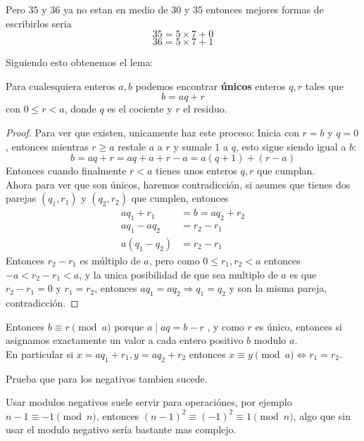 \documentclass[11pt]{scrartcl}
\begin{document}
Pero $35$ y $36$ ya no estan en medio de $30$ y $35$ entonces mejores formas de escribirlos seria
\[35= 5\times 7+0\]
\[36= 5 \times 7 +1\]

Siguiendo esto obtenemos el lema:
\begin{lemma} 
Para cualesquiera enteros $a,b$ podemos encontrar \textbf{\'unicos} enteros $q,r$ tales que 
\[b = aq+r\]
con $0 \leq r <a$, donde $q$ es el cociente y $r$ el residuo.
\end{lemma}

\begin{proof}
Para ver que existen, unicamente haz este proceso: Inicia con $r=b$ y $q=0$, entonces mientras $r\geq a$ restale $a$ a $r$ y sumale $1$ a $q$, esto sigue siendo igual a $b$:
\[b=aq+r = aq+a+r-a = a(q+1)+(r-a)\]
Entonces cuando finalmente $r<a$ tienes unos enteros $q,r$ que cumplan. \\

Ahora para ver que son \'unicos, haremos contradicci\'on, si asumes que tienes dos parejas $(q_1,r_1)$ y $(q_2, r_2)$ que cumplen, entonces 
\begin{align*}
aq_1+r_1&=b=aq_2+r_2 \\
aq_1-aq_2&=r_2-r_1 \\
a(q_1-q_2)&=r_2-r_1 
\end{align*}
Entonces $r_2-r_1$ es m\'ultiplo de $a$, pero como $0\leq r_1,r_2 < a$ entonces $-a < r_2-r_1  < a$, y la unica posibilidad de que sea multiplo de $a$ es que $r_2-r_1=0$ y $r_1=r_2$, entonces $aq_1=aq_2 \Rightarrow q_1=q_2$ y son la misma pareja, contradicci\'on.

\end{proof}

Entonces $b \equiv r \pmod a$ porque $a \mid aq = b-r$ , y como $r$ es \'unico, entonces si asignamos exactamente un valor a cada entero positivo $b$ modulo $a$. \\

En particular si $x=aq_1+r_1, y=aq_2+r_2$ entonces $x \equiv y \pmod a \iff r_1=r_2$.


\begin{exercise}
Prueba que para los negativos tambien sucede.
\end{exercise}
\begin{remark*}
Usar modulos negativos suele servir para operaci\'ones, por ejemplo $n-1 \equiv -1 \pmod n$, entonces $(n-1)^2 \equiv (-1)^2 \equiv 1 \pmod n$, algo que sin usar el modulo negativo ser\'ia bastante mas complejo.
\end{remark*}
\end{document}
